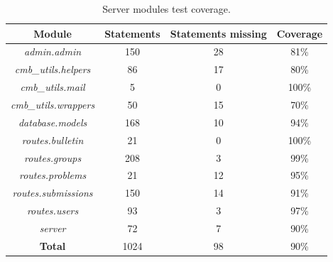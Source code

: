 \begin{table}[h!]
    \centering
    \begin{tabular}{c c c c}
      \hline
      \textbf{Module} & \textbf{Statements} & \textbf{Statements missing} & \textbf{Coverage} \\ \hline
      \textit{admin.admin} & 150 & 28 & 81\% \\
      \textit{cmb\_utils.helpers} & 86 & 17 & 80\% \\
      \textit{cmb\_utils.mail} & 5 & 0 & 100\% \\
      \textit{cmb\_utils.wrappers} & 50 & 15 & 70\% \\
      \textit{database.models} & 168 & 10 & 94\% \\
      \textit{routes.bulletin} & 21 & 0 & 100\% \\
      \textit{routes.groups} & 208 & 3 & 99\% \\
      \textit{routes.problems} & 21 & 12 & 95\% \\
      \textit{routes.submissions} & 150 & 14 & 91\% \\
      \textit{routes.users} & 93 & 3 & 97\% \\
      \textit{server} & 72 & 7 & 90\% \\ \hline
      \textbf{Total} & 1024 & 98 & 90\% \\ \hline
    \end{tabular}
    \caption{Server modules test coverage.}
    \label{tab:server-module-coverage}
\end{table}
